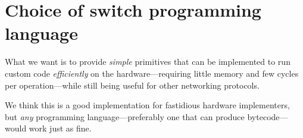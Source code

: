 \section{Choice of switch programming language}


What we want is to provide \textit{simple} primitives that can be
implemented to run custom code \textit{efficiently} on the
hardware---requiring little memory and few cycles per operation---while
still being useful for other networking protocols.

We think this is a good implementation for fastidious hardware implementers,
but \textit{any} programming language---preferably one that can produce
bytecode---would work just as fine.

